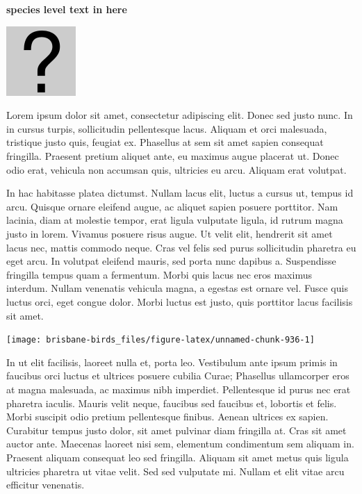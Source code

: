 \documentclass[]{book}
\let\origfigure\figure
\let\endorigfigure\endfigure
\renewenvironment{figure}[1][2] {
  \expandafter\origfigure\expandafter[H]
} {
  \endorigfigure
}
\begin{document}
\textbf{species level text in here}

\begin{figure}
\centering
\includegraphics{assets/missing.png}
\caption{No image for species}
\end{figure}

Lorem ipsum dolor sit amet, consectetur adipiscing elit. Donec sed justo
nunc. In in cursus turpis, sollicitudin pellentesque lacus. Aliquam et
orci malesuada, tristique justo quis, feugiat ex. Phasellus at sem sit
amet sapien consequat fringilla. Praesent pretium aliquet ante, eu
maximus augue placerat ut. Donec odio erat, vehicula non accumsan quis,
ultricies eu arcu. Aliquam erat volutpat.

In hac habitasse platea dictumst. Nullam lacus elit, luctus a cursus ut,
tempus id arcu. Quisque ornare eleifend augue, ac aliquet sapien posuere
porttitor. Nam lacinia, diam at molestie tempor, erat ligula vulputate
ligula, id rutrum magna justo in lorem. Vivamus posuere risus augue. Ut
velit elit, hendrerit sit amet lacus nec, mattis commodo neque. Cras vel
felis sed purus sollicitudin pharetra eu eget arcu. In volutpat eleifend
mauris, sed porta nunc dapibus a. Suspendisse fringilla tempus quam a
fermentum. Morbi quis lacus nec eros maximus interdum. Nullam venenatis
vehicula magna, a egestas est ornare vel. Fusce quis luctus orci, eget
congue dolor. Morbi luctus est justo, quis porttitor lacus facilisis sit
amet.

\begin{figure}
\texttt{[image: brisbane-birds\_files/figure-latex/unnamed-chunk-936-1]} \caption{insert figure caption}\label{fig:unnamed-chunk-936}
\end{figure}

In ut elit facilisis, laoreet nulla et, porta leo. Vestibulum ante ipsum
primis in faucibus orci luctus et ultrices posuere cubilia Curae;
Phasellus ullamcorper eros at magna malesuada, ac maximus nibh
imperdiet. Pellentesque id purus nec erat pharetra iaculis. Mauris velit
neque, faucibus sed faucibus et, lobortis et felis. Morbi suscipit odio
pretium pellentesque finibus. Aenean ultrices ex sapien. Curabitur
tempus justo dolor, sit amet pulvinar diam fringilla at. Cras sit amet
auctor ante. Maecenas laoreet nisi sem, elementum condimentum sem
aliquam in. Praesent aliquam consequat leo sed fringilla. Aliquam sit
amet metus quis ligula ultricies pharetra ut vitae velit. Sed sed
vulputate mi. Nullam et elit vitae arcu efficitur venenatis.
\end{document}
